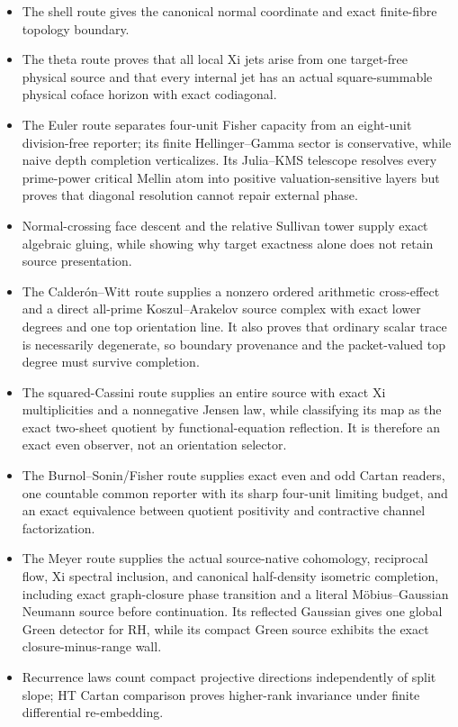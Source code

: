 \documentclass[11pt]{article}
\theoremstyle{definition}
\theoremstyle{remark}
\begin{document}
\begin{itemize}[leftmargin=2em]
\item The shell route gives the canonical normal coordinate and exact
      finite-fibre topology boundary.
\item The theta route proves that all local Xi jets arise from one
      target-free physical source and that every internal jet has an actual
      square-summable physical coface horizon with exact codiagonal.
\item The Euler route separates four-unit Fisher capacity from an
      eight-unit division-free reporter; its finite Hellinger--Gamma sector
      is conservative, while naive depth completion verticalizes.  Its
      Julia--KMS telescope resolves every prime-power critical Mellin atom
      into positive valuation-sensitive layers but proves that diagonal
      resolution cannot repair external phase.
\item Normal-crossing face descent and the relative Sullivan tower supply
      exact algebraic gluing, while showing why target exactness alone does
      not retain source presentation.
\item The Calder\'on--Witt route supplies a nonzero ordered arithmetic
      cross-effect and a direct all-prime Koszul--Arakelov source complex
      with exact lower degrees and one top orientation line.  It also proves
      that ordinary scalar trace is necessarily degenerate, so boundary
      provenance and the packet-valued top degree must survive completion.
\item The squared-Cassini route supplies an entire source with exact Xi
      multiplicities and a nonnegative Jensen law, while classifying its map
      as the exact two-sheet quotient by functional-equation reflection.  It
      is therefore an exact even observer, not an orientation selector.
\item The Burnol--Sonin/Fisher route supplies exact even and odd Cartan
      readers, one countable common reporter with its sharp four-unit
      limiting budget, and an exact
      equivalence between quotient positivity and contractive channel
      factorization.
\item The Meyer route supplies the actual source-native cohomology,
      reciprocal flow, Xi spectral inclusion, and canonical half-density
      isometric completion, including exact graph-closure phase transition
      and a literal M\"obius--Gaussian Neumann source before continuation.
      Its reflected Gaussian gives one global Green detector for RH, while
      its compact Green source exhibits the exact closure-minus-range wall.
\item Recurrence laws count compact projective directions independently of
      split slope; HT Cartan comparison proves higher-rank invariance under
      finite differential re-embedding.
\end{itemize}
\end{document}
